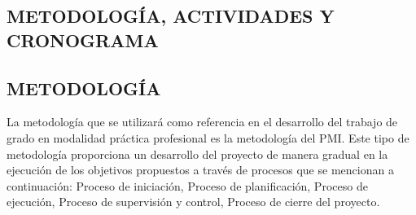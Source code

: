 \begin{center}
\section{METODOLOGÍA, ACTIVIDADES Y CRONOGRAMA}
\end{center}

\subsection{METODOLOGÍA}
La metodología que se utilizará como referencia en el desarrollo del trabajo de grado en modalidad práctica profesional es la metodología del PMI. Este tipo de metodología proporciona un desarrollo del proyecto de manera gradual en la ejecución de los objetivos propuestos a través de procesos que se mencionan a continuación: Proceso de iniciación, Proceso de planificación, Proceso de ejecución, Proceso de supervisión y control, Proceso de cierre del proyecto.

